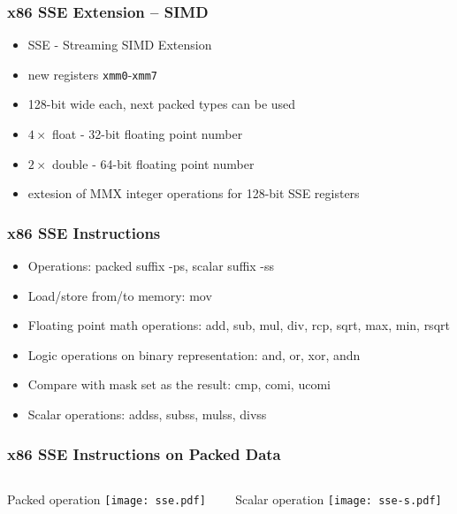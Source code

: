 \documentclass{beamer}
\begin{document}
\begin{frame}
\frametitle{x86 SSE Extension -- SIMD}
\begin{itemize}
\item SSE - Streaming SIMD Extension
\item new registers \texttt{xmm0}-\texttt{xmm7}
\item 128-bit wide each, next packed types can be used
\item $4\times$ float - 32-bit floating point number
\item $2\times$ double - 64-bit floating point number
\item extesion of MMX integer operations for 128-bit SSE registers
\end{itemize}
\end{frame}



\begin{frame}
\frametitle{x86 SSE Instructions}
\begin{itemize}

\item Operations: packed suffix -ps, scalar suffix -ss 



\item Load/store from/to memory: mov
\item Floating point math operations: add, sub, mul, div, rcp, sqrt, max, min, rsqrt
\item Logic operations on binary representation: and, or, xor, andn
\item Compare with mask set as the result: cmp, comi, ucomi


\item Scalar operations: addss, subss, mulss, divss
\end{itemize}
\end{frame}

\begin{frame}
\frametitle{x86 SSE Instructions on Packed Data}
\begin{columns}[t,onlytextwidth]
\begin{column}{0.5\textwidth}
\begin{center}
Packed operation
\texttt{[image: sse.pdf]}
\end{center}
\end{column}
\begin{column}{0.5\textwidth}
\begin{center}
Scalar operation
\texttt{[image: sse-s.pdf]}
\end{center}
\end{column}
\end{columns}
\end{frame}
\end{document}
